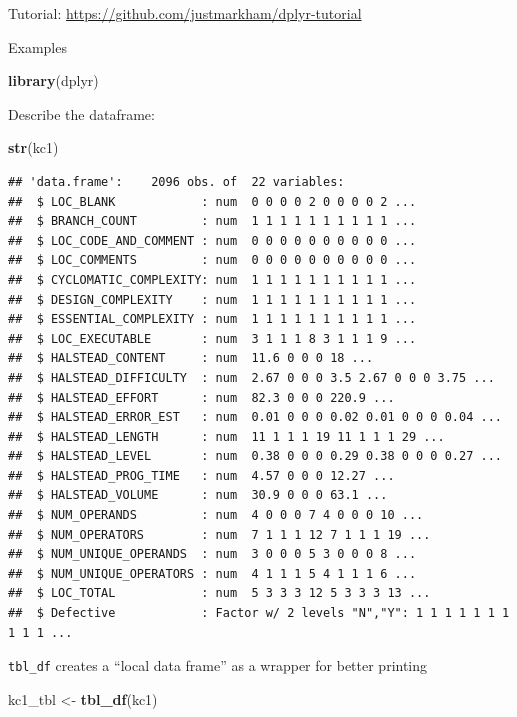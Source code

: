 \documentclass[]{book}
\newenvironment{Shaded}{\begin{snugshade}}{\end{snugshade}}
\newcommand{\KeywordTok}[1]{\textcolor[rgb]{0.13,0.29,0.53}{\textbf{{#1}}}}
\newcommand{\StringTok}[1]{\textcolor[rgb]{0.31,0.60,0.02}{{#1}}}
\newcommand{\NormalTok}[1]{{#1}}
\begin{document}
Tutorial: \url{https://github.com/justmarkham/dplyr-tutorial}

Examples

\begin{Shaded}
\begin{Highlighting}[]
\KeywordTok{library}\NormalTok{(dplyr)}
\end{Highlighting}
\end{Shaded}

Describe the dataframe:

\begin{Shaded}
\begin{Highlighting}[]
\KeywordTok{str}\NormalTok{(kc1)}
\end{Highlighting}
\end{Shaded}

\begin{verbatim}
## 'data.frame':    2096 obs. of  22 variables:
##  $ LOC_BLANK            : num  0 0 0 0 2 0 0 0 0 2 ...
##  $ BRANCH_COUNT         : num  1 1 1 1 1 1 1 1 1 1 ...
##  $ LOC_CODE_AND_COMMENT : num  0 0 0 0 0 0 0 0 0 0 ...
##  $ LOC_COMMENTS         : num  0 0 0 0 0 0 0 0 0 0 ...
##  $ CYCLOMATIC_COMPLEXITY: num  1 1 1 1 1 1 1 1 1 1 ...
##  $ DESIGN_COMPLEXITY    : num  1 1 1 1 1 1 1 1 1 1 ...
##  $ ESSENTIAL_COMPLEXITY : num  1 1 1 1 1 1 1 1 1 1 ...
##  $ LOC_EXECUTABLE       : num  3 1 1 1 8 3 1 1 1 9 ...
##  $ HALSTEAD_CONTENT     : num  11.6 0 0 0 18 ...
##  $ HALSTEAD_DIFFICULTY  : num  2.67 0 0 0 3.5 2.67 0 0 0 3.75 ...
##  $ HALSTEAD_EFFORT      : num  82.3 0 0 0 220.9 ...
##  $ HALSTEAD_ERROR_EST   : num  0.01 0 0 0 0.02 0.01 0 0 0 0.04 ...
##  $ HALSTEAD_LENGTH      : num  11 1 1 1 19 11 1 1 1 29 ...
##  $ HALSTEAD_LEVEL       : num  0.38 0 0 0 0.29 0.38 0 0 0 0.27 ...
##  $ HALSTEAD_PROG_TIME   : num  4.57 0 0 0 12.27 ...
##  $ HALSTEAD_VOLUME      : num  30.9 0 0 0 63.1 ...
##  $ NUM_OPERANDS         : num  4 0 0 0 7 4 0 0 0 10 ...
##  $ NUM_OPERATORS        : num  7 1 1 1 12 7 1 1 1 19 ...
##  $ NUM_UNIQUE_OPERANDS  : num  3 0 0 0 5 3 0 0 0 8 ...
##  $ NUM_UNIQUE_OPERATORS : num  4 1 1 1 5 4 1 1 1 6 ...
##  $ LOC_TOTAL            : num  5 3 3 3 12 5 3 3 3 13 ...
##  $ Defective            : Factor w/ 2 levels "N","Y": 1 1 1 1 1 1 1 1 1 1 ...
\end{verbatim}

\texttt{tbl\_df} creates a ``local data frame'' as a wrapper for better
printing

\begin{Shaded}
\begin{Highlighting}[]
\NormalTok{kc1_tbl <-}\StringTok{ }\KeywordTok{tbl_df}\NormalTok{(kc1)}
\end{Highlighting}
\end{Shaded}
\end{document}
